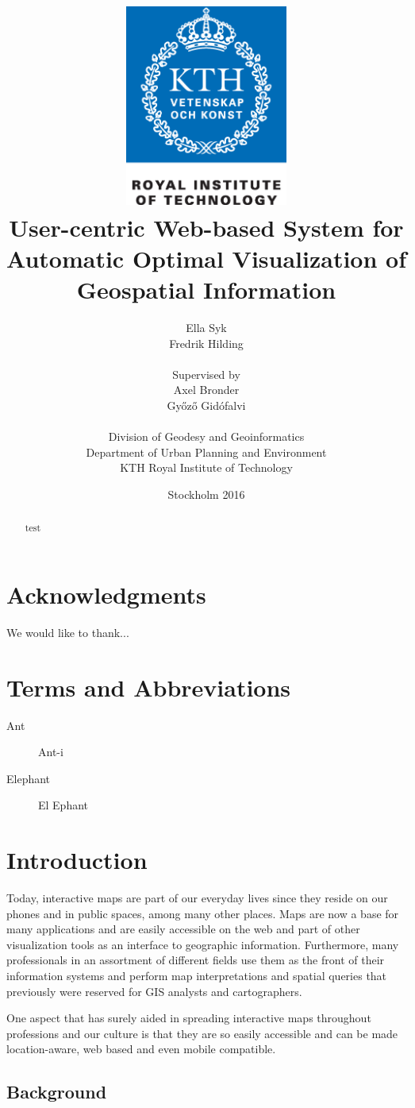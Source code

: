 \documentclass[a4paper,12pt,titlepage]{article}
\title{
\includegraphics[width=0.4\textwidth]{KTH_eng_CMYK.eps} \\[1cm] User-centric Web-based System for Automatic Optimal Visualization of Geospatial Information \\
}
\author{Ella Syk \\ 
Fredrik Hilding \\ \\
Supervised by \\
Axel Bronder \\
Gy\H oz\H o Gid\'ofalvi \\ \\
Division of Geodesy and Geoinformatics\\
Department of Urban Planning and Environment\\
KTH Royal Institute of Technology}
\date{Stockholm 2016}
\begin{document}
\maketitle
\begin{abstract}
test
\end{abstract}
\newpage
\section*{Acknowledgments}
{}%
We would like to thank...
\newpage
\tableofcontents
{}
\newpage
\listoffigures
\newpage
\listoftables
\newpage
\section*{Terms and Abbreviations}
\begin{description}
\item [Ant] Ant-i
\item [Elephant] El Ephant
\end{description}

\newpage

\section{Introduction}

Today, interactive maps are part of our everyday lives since they reside on our phones and in public spaces, among many other places. Maps are now a base for many applications and are easily accessible on the web and part of other visualization tools as an interface to geographic information. Furthermore, many professionals in an assortment of different fields use them as the front of their information systems and perform map interpretations and spatial queries that previously were reserved for GIS analysts and cartographers.

One aspect that has surely aided in spreading interactive maps throughout professions and our culture is that they are so easily accessible and can be made location-aware, web based and even mobile compatible.


\subsection{Background}
\end{document}
